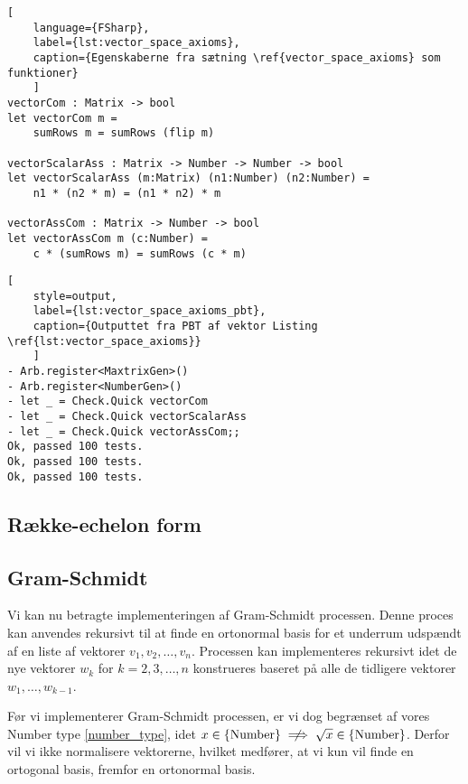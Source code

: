 \begin{lstlisting}[
    language={FSharp}, 
    label={lst:vector_space_axioms}, 
    caption={Egenskaberne fra sætning \ref{vector_space_axioms} som funktioner}
    ]
vectorCom : Matrix -> bool
let vectorCom m =
    sumRows m = sumRows (flip m)

vectorScalarAss : Matrix -> Number -> Number -> bool
let vectorScalarAss (m:Matrix) (n1:Number) (n2:Number) =
    n1 * (n2 * m) = (n1 * n2) * m

vectorAssCom : Matrix -> Number -> bool
let vectorAssCom m (c:Number) =
    c * (sumRows m) = sumRows (c * m)
\end{lstlisting}

\begin{lstlisting}[
    style=output, 
    label={lst:vector_space_axioms_pbt}, 
    caption={Outputtet fra PBT af vektor Listing \ref{lst:vector_space_axioms}}
    ]
- Arb.register<MaxtrixGen>()
- Arb.register<NumberGen>()
- let _ = Check.Quick vectorCom
- let _ = Check.Quick vectorScalarAss
- let _ = Check.Quick vectorAssCom;;
Ok, passed 100 tests.
Ok, passed 100 tests.
Ok, passed 100 tests.
\end{lstlisting}

\subsection{Række-echelon form}
\subsection{Gram-Schmidt}\label{sec:gram_schmidt}
Vi kan nu betragte implementeringen af Gram-Schmidt processen. Denne proces kan anvendes rekursivt til at finde en ortonormal basis for et underrum udspændt af en liste af vektorer $v_1, v_2, \ldots, v_n$. Processen kan implementeres rekursivt idet de nye vektorer $w_k$ for $k = 2, 3, \ldots, n$ konstrueres baseret på alle de tidligere vektorer $w_1, \ldots, w_{k-1}$. 

Før vi implementerer Gram-Schmidt processen, er vi dog begrænset af vores Number type \ref{number_type}, idet $x \in \text{\{Number\}} \centernot\implies \sqrt{x} \in \text{\{Number\}}$. Derfor vil vi ikke normalisere vektorerne, hvilket medfører, at vi kun vil finde en ortogonal basis, fremfor en ortonormal basis.

